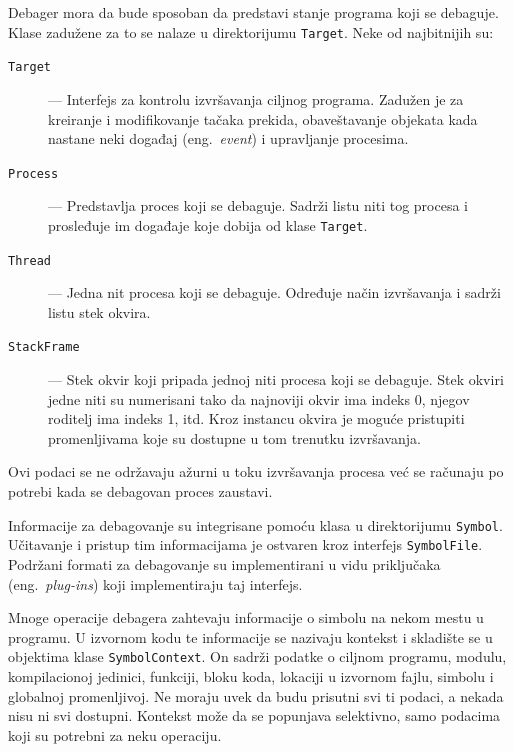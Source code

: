 \documentclass[12pt,oneside]{memoir}
\begin{document}
Debager mora da bude sposoban da predstavi stanje programa koji se debaguje.
Klase zadužene za to se nalaze u direktorijumu \verb|Target|.
Neke od najbitnijih su:
\begin{description}
  \item[\texttt{Target}] --- Interfejs za kontrolu izvršavanja ciljnog programa. Zadužen je za kreiranje i modifikovanje tačaka prekida, obaveštavanje objekata kada nastane neki događaj (eng.~{\em event}) i upravljanje procesima.
  \item[\texttt{Process}] --- Predstavlja proces koji se debaguje. Sadrži listu niti tog procesa i prosleđuje im događaje koje dobija od klase \verb|Target|.
  \item[\texttt{Thread}] --- Jedna nit procesa koji se debaguje. Određuje način izvršavanja i sadrži listu stek okvira.
  \item[\texttt{StackFrame}] --- Stek okvir koji pripada jednoj niti procesa koji se debaguje. Stek okviri jedne niti su numerisani tako da najnoviji okvir ima indeks 0, njegov roditelj ima indeks 1, itd. Kroz instancu okvira je moguće pristupiti promenljivama koje su dostupne u tom trenutku izvršavanja.
\end{description}
Ovi podaci se ne održavaju ažurni u toku izvršavanja procesa već se računaju po potrebi kada se debagovan proces zaustavi.

Informacije za debagovanje su integrisane pomoću klasa u direktorijumu \verb|Symbol|.
Učitavanje i pristup tim informacijama je ostvaren kroz interfejs \verb|SymbolFile|.
Podržani formati za debagovanje su implementirani u vidu priključaka (eng.~{\em plug-ins}) koji implementiraju taj interfejs.

Mnoge operacije debagera zahtevaju informacije o simbolu na nekom mestu u programu.
U izvornom kodu te informacije se nazivaju kontekst i skladište se u objektima klase \verb|SymbolContext|.
On sadrži podatke o ciljnom programu, modulu, kompilacionoj jedinici, funkciji, bloku koda, lokaciji u izvornom fajlu, simbolu i globalnoj promenljivoj.
Ne moraju uvek da budu prisutni svi ti podaci, a nekada nisu ni svi dostupni.
Kontekst može da se popunjava selektivno, samo podacima koji su potrebni za neku operaciju.
\end{document}
